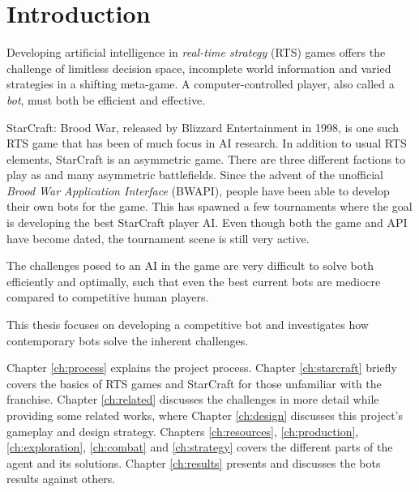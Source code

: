 \chapter{Introduction}
Developing artificial intelligence in \emph{real-time strategy} (RTS) games offers the challenge of limitless decision space, incomplete world information and varied strategies in a shifting meta-game. A computer-controlled player, also called a \emph{bot}, must both be efficient and effective.

StarCraft: Brood War, released by Blizzard Entertainment in 1998, is one such RTS game that has been of much focus in AI research. In addition to usual RTS elements, StarCraft is an asymmetric game. There are three different factions to play as and many asymmetric battlefields. Since the advent of the unofficial \emph{Brood War Application Interface} (BWAPI), people have been able to develop their own bots for the game. This has spawned a few tournaments where the goal is developing the best StarCraft player AI. Even though both the game and API have become dated, the tournament scene is still very active.

The challenges posed to an AI in the game are very difficult to solve both efficiently and optimally, such that even the best current bots are mediocre compared to competitive human players.

This thesis focuses on developing a competitive bot and investigates how contemporary bots solve the inherent challenges.

Chapter \ref{ch:process} explains the project process. Chapter \ref{ch:starcraft} briefly covers the basics of RTS games and StarCraft for those unfamiliar with the franchise. Chapter \ref{ch:related} discusses the challenges in more detail while providing some related works, where Chapter \ref{ch:design} discusses this project's gameplay and design strategy. Chapters \ref{ch:resources}, \ref{ch:production}, \ref{ch:exploration}, \ref{ch:combat} and \ref{ch:strategy} covers the different parts of the agent and its solutions. Chapter \ref{ch:results} presents and discusses the bots results against others.